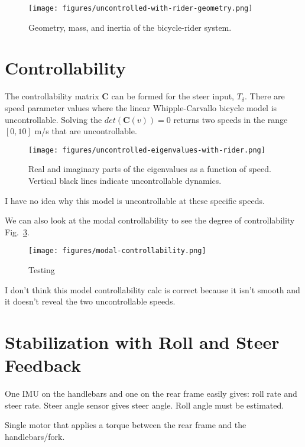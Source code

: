 \documentclass[12pt]{article}
\begin{document}
\begin{figure}
  \centering
  \texttt{[image: figures/uncontrolled-with-rider-geometry.png]}
  \caption{Geometry, mass, and inertia of the bicycle-rider system.}
  \label{fig:uncontrolled-with-rider-geometry}
\end{figure}

\section{Controllability}

The controllability matrix \(\mathbf{C}\) can be formed for the steer input,
\(T_\delta\). There are speed parameter values where the linear
Whipple-Carvallo bicycle model is uncontrollable. Solving the
\(det(\mathbf{C}(v))=0\) returns two speeds in the range \([0, 10]\) m/s that
are uncontrollable.

\begin{figure}
  \centering
  \texttt{[image: figures/uncontrolled-eigenvalues-with-rider.png]}
  \caption{Real and imaginary parts of the eigenvalues as a function of speed.
  Vertical black lines indicate uncontrollable dynamics.}
  \label{fig:uncontrolled-eigenvalues-with-rider}
\end{figure}

I have no idea why this model is uncontrollable at these specific speeds.

We can also look at the modal controllability to see the degree of
controllability Fig.~\ref{fig:modal-controllability}.

\begin{figure}
  \centering
  \texttt{[image: figures/modal-controllability.png]}
  \caption{Testing}
  \label{fig:modal-controllability}
\end{figure}

I don't think this model controllability calc is correct because it isn't
smooth and it doesn't reveal the two uncontrollable speeds.

\section{Stabilization with Roll and Steer Feedback}

One IMU on the handlebars and one on the rear frame easily gives: roll rate and
steer rate. Steer angle sensor gives steer angle. Roll angle must be estimated.

Single motor that applies a torque between the rear frame and the
handlebars/fork.
\end{document}
